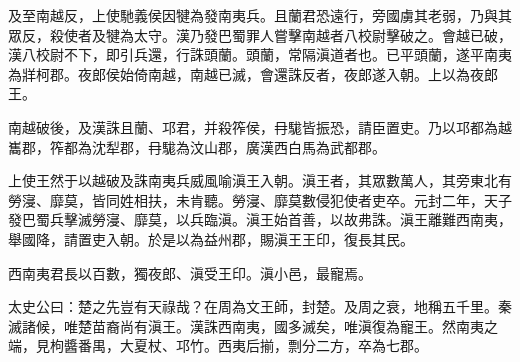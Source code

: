 \begin{pinyinscope}
及至南越反，上使馳義侯因犍為發南夷兵。且蘭君恐遠行，旁國虜其老弱，乃與其眾反，殺使者及犍為太守。漢乃發巴蜀罪人嘗擊南越者八校尉擊破之。會越已破，漢八校尉不下，即引兵還，行誅頭蘭。頭蘭，常隔滇道者也。已平頭蘭，遂平南夷為牂柯郡。夜郎侯始倚南越，南越已滅，會還誅反者，夜郎遂入朝。上以為夜郎王。

南越破後，及漢誅且蘭、邛君，并殺筰侯，冄駹皆振恐，請臣置吏。乃以邛都為越巂郡，筰都為沈犁郡，冄駹為汶山郡，廣漢西白馬為武都郡。

上使王然于以越破及誅南夷兵威風喻滇王入朝。滇王者，其眾數萬人，其旁東北有勞寖、靡莫，皆同姓相扶，未肯聽。勞寖、靡莫數侵犯使者吏卒。元封二年，天子發巴蜀兵擊滅勞寖、靡莫，以兵臨滇。滇王始首善，以故弗誅。滇王離難西南夷，舉國降，請置吏入朝。於是以為益州郡，賜滇王王印，復長其民。

西南夷君長以百數，獨夜郎、滇受王印。滇小邑，最寵焉。

太史公曰：楚之先豈有天祿哉？在周為文王師，封楚。及周之衰，地稱五千里。秦滅諸候，唯楚苗裔尚有滇王。漢誅西南夷，國多滅矣，唯滇復為寵王。然南夷之端，見枸醬番禺，大夏杖、邛竹。西夷后揃，剽分二方，卒為七郡。


\end{pinyinscope}
